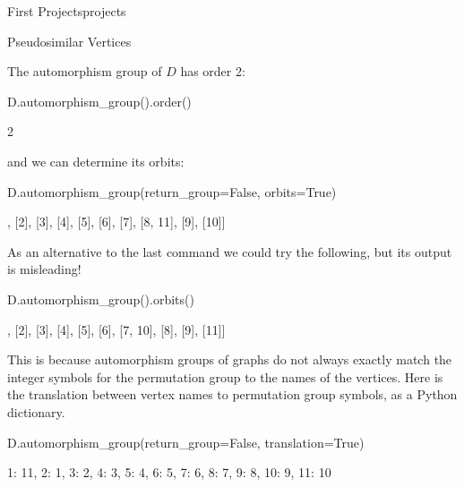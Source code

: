 \begin{chap}{First Projects}{projects}
\begin{sect}{Pseudosimilar Vertices}
%
\begin{para}
The automorphism group of $D$ has order 2:
\end{para}
%
\begin{sagecode}
\begin{sageinput}
D.automorphism_group().order()
\end{sageinput}
\begin{sageoutput}
2
\end{sageoutput}
\end{sagecode}
%
\begin{para}
and we can determine its orbits:
\end{para}
%
\begin{sagecode}
\begin{sageinput}
D.automorphism_group(return_group=False, orbits=True)
\end{sageinput}
\begin{sageoutput}
[[1], [2], [3], [4], [5], [6], [7], [8, 11], [9], [10]]
\end{sageoutput}
\end{sagecode}
%
\begin{para}
As an alternative to the last command we could try the following, but its
output is misleading!
\end{para}
%
\begin{sagecode}
\begin{sageinput}
D.automorphism_group().orbits()
\end{sageinput}
\begin{sageoutput}
[[1], [2], [3], [4], [5], [6], [7, 10], [8], [9], [11]]
\end{sageoutput}
\end{sagecode}
%
\begin{para}
This is because automorphism groups of graphs do not always exactly match the integer symbols for the permutation group to the names of the vertices.  Here is the translation between vertex names to permutation group symbols, as a Python dictionary.
\end{para}
%
\begin{sagecode}
\begin{sageinput}
D.automorphism_group(return_group=False, translation=True)
\end{sageinput}
\begin{sageoutput}
{1: 11, 2: 1, 3: 2, 4: 3, 5: 4, 6: 5, 7: 6, 8: 7, 9: 8, 10: 9, 11: 10}
\end{sageoutput}
\end{sagecode}
%
\begin{para}

\end{para}
\end{sect}
\end{chap}
